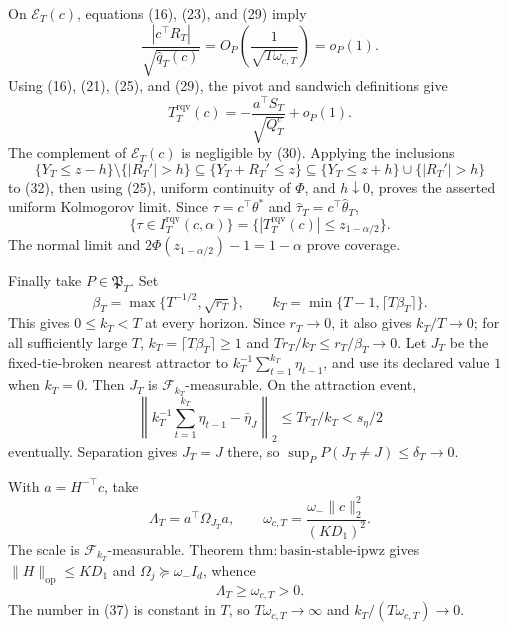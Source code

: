 On \(\mathcal E_T(c)\), equations (16), (23), and (29) imply
\[
 \frac{|c^\top R_T|}{\sqrt{\widehat q_T(c)}}
 =O_P\!\left(\frac1{\sqrt{T\omega_{c,T}}}\right)=o_P(1).
\tag{31}
\]
Using (16), (21), (25), and (29), the pivot and sandwich definitions give
\[
 T_T^{\mathrm{rqv}}(c)
 =-\frac{a^\top S_T}{\sqrt{Q_T^c}}+o_P(1).
\tag{32}
\]
The complement of \(\mathcal E_T(c)\) is negligible by (30).  Applying
the inclusions
\[
 \{Y_T\le z-h\}\setminus\{|R_T'|>h\}
 \subseteq\{Y_T+R_T'\le z\}
 \subseteq\{Y_T\le z+h\}\cup\{|R_T'|>h\}
\tag{33}
\]
to (32), then using (25), uniform continuity of \(\Phi\), and
\(h\downarrow0\), proves the asserted uniform Kolmogorov limit.  Since
\(\tau=c^\top\theta^*\) and \(\widehat\tau_T=c^\top\widehat\theta_T\),
\[
 \{\tau\in I_T^{\mathrm{rqv}}(c,\alpha)\}
 =\{|T_T^{\mathrm{rqv}}(c)|\le z_{1-\alpha/2}\}.
\tag{34}
\]
The normal limit and \(2\Phi(z_{1-\alpha/2})-1=1-\alpha\) prove coverage.

Finally take \(P\in\mathfrak P_T\).  Set
\[
 \beta_T=\max\{T^{-1/2},\sqrt{r_T}\},\qquad
 k_T=\min\{T-1,\lceil T\beta_T\rceil\}.
\tag{35}
\]
This gives \(0\le k_T<T\) at every horizon.  Since \(r_T\to0\), it also
gives \(k_T/T\to0\); for all sufficiently large \(T\),
\(k_T=\lceil T\beta_T\rceil\ge1\) and \(Tr_T/k_T\le
r_T/\beta_T\to0\).  Let \(J_T\) be the fixed-tie-broken nearest attractor
to \(k_T^{-1}\sum_{t=1}^{k_T}\eta_{t-1}\), and use its declared value
\(1\) when \(k_T=0\).  Then \(J_T\) is \(\mathcal F_{k_T}\)-measurable.
On the attraction event,
\[
 \left\|k_T^{-1}\sum_{t=1}^{k_T}\eta_{t-1}-\bar\eta_J\right\|_2
 \le Tr_T/k_T<s_\eta/2
\tag{36}
\]
eventually.  Separation gives \(J_T=J\) there, so
\(\sup_PP(J_T\ne J)\le\delta_T\to0\).

With \(a=H^{-\top}c\), take
\[
 \Lambda_T=a^\top\Omega_{J_T}a,
 \qquad \omega_{c,T}=\frac{\omega_-\|c\|_2^2}{(KD_1)^2}.
\tag{37}
\]
The scale is \(\mathcal F_{k_T}\)-measurable.  Theorem
\(\mathrm{thm:basin\text{-}stable\text{-}ipwz}\) gives
\(\|H\|_{\mathrm{op}}\le KD_1\) and
\(\Omega_j\succeq\omega_-I_d\), whence
\[
 \Lambda_T\ge\omega_{c,T}>0.
\tag{38}
\]
The number in (37) is constant in \(T\), so
\(T\omega_{c,T}\to\infty\) and \(k_T/(T\omega_{c,T})\to0\).

